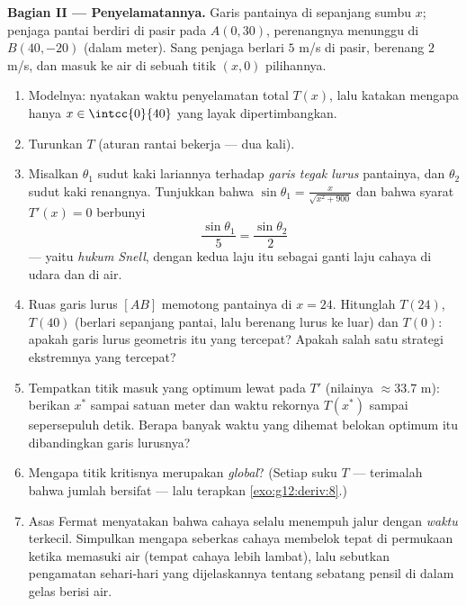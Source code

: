 \begin{problem}
\medskip
\noindent\textbf{Bagian II --- Penyelamatannya.}
Garis pantainya di sepanjang sumbu $x$; penjaga pantai berdiri di pasir pada
$A(0, 30)$, perenangnya menunggu di $B(40, -20)$ (dalam meter). Sang
penjaga berlari $5$ m/s di pasir, berenang $2$ m/s, dan masuk ke
air di sebuah titik $(x, 0)$ pilihannya.
\begin{enumerate}[resume]
  \item Modelnya: nyatakan waktu penyelamatan total $T(x)$, lalu katakan
        mengapa hanya $x \in \intcc{0}{40}$ yang layak dipertimbangkan.
  \item Turunkan $T$ (aturan rantai bekerja --- dua kali).
  \item Misalkan $\theta_1$ sudut kaki lariannya terhadap
        \emph{garis tegak lurus} pantainya, dan $\theta_2$ sudut
        kaki renangnya. Tunjukkan bahwa
        $\sin\theta_1 = \frac{x}{\sqrt{x^2 + 900}}$ dan bahwa
        syarat $T'(x) = 0$ berbunyi
        \[
        \frac{\sin\theta_1}{5} = \frac{\sin\theta_2}{2}
        \]
        --- yaitu \emph{hukum Snell}, dengan kedua laju itu sebagai ganti
        laju cahaya di udara dan di air.
  \item Ruas garis lurus $[AB]$ memotong pantainya di
        $x = 24$. Hitunglah $T(24)$, $T(40)$ (berlari sepanjang
        pantai, lalu berenang lurus ke luar) dan $T(0)$: apakah
        garis lurus geometris itu yang tercepat? Apakah salah satu strategi
        ekstremnya yang tercepat?
  \item Tempatkan titik masuk yang optimum lewat  pada
        $T'$ (nilainya $\approx 33.7$ m): berikan $x^*$ sampai satuan meter
        dan waktu rekornya $T(x^*)$ sampai sepersepuluh detik.
        Berapa banyak waktu yang dihemat belokan optimum itu dibandingkan
        garis lurusnya?
  \item Mengapa titik kritisnya merupakan  \emph{global}?
        (Setiap suku $T$  --- terimalah bahwa jumlah 
         bersifat  --- lalu terapkan
        \cref{exo:g12:deriv:8}.)
  \item Asas Fermat menyatakan bahwa cahaya selalu menempuh
        jalur dengan \emph{waktu} terkecil. Simpulkan mengapa seberkas cahaya
        membelok tepat di permukaan ketika memasuki air
        (tempat cahaya lebih lambat), lalu sebutkan pengamatan
        sehari-hari yang dijelaskannya tentang sebatang pensil di dalam gelas
        berisi air.
\end{enumerate}


\end{problem}
